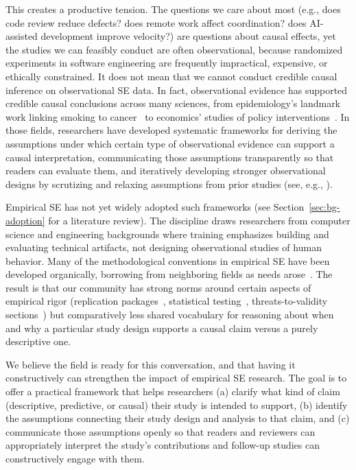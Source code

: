 This creates a productive tension. 
The questions we care about most (e.g., does code review reduce defects? does remote work affect coordination? does AI-assisted development improve velocity?) are questions about causal effects, yet the studies we can feasibly conduct are often observational, because randomized experiments in software engineering are frequently impractical, expensive, or ethically constrained. 
It does not mean that we cannot conduct credible causal inference on observational SE data.
In fact, observational evidence has supported credible causal conclusions across many sciences, from epidemiology's landmark work linking smoking to cancer~\cite{samet2016epidemiology} to economics' studies of policy interventions~\cite{abadie2018econometric}.
In those fields, researchers have developed systematic frameworks for deriving the assumptions under which certain type of observational evidence can support a causal interpretation, communicating those assumptions transparently so that readers can evaluate them, and iteratively developing stronger observational designs by scrutizing and relaxing assumptions from prior studies (see, e.g., \citet{angrist2010credibility, pearl2009causality, cunningham2021causal}).

Empirical SE has not yet widely adopted such frameworks (see Section~\ref{sec:bg-adoption} for a literature review). 
The discipline draws researchers from computer science and engineering backgrounds where training emphasizes building and evaluating technical artifacts, not designing observational studies of human behavior. 
Many of the methodological conventions in empirical SE have been developed organically, borrowing from neighboring fields as needs arose~\cite{DBLP:journals/jss/TichyLPH95, DBLP:books/sp/08/EasterbrookSSD08}.
The result is that our community has strong norms around certain aspects of empirical rigor (replication packages~\cite{DBLP:journals/corr/abs-2010-03525}, statistical testing~\cite{DBLP:books/sp/WohlinRHORW24}, threats-to-validity sections~\cite{DBLP:journals/tosem/RobillardAEGLNNSSS24}) but comparatively less shared vocabulary for reasoning about when and why a particular study design supports a causal claim versus a purely descriptive one.

We believe the field is ready for this conversation, and that having it constructively can strengthen the impact of empirical SE research. 
The goal is to offer a practical framework that helps researchers (a) clarify what kind of claim (descriptive, predictive, or causal) their study is intended to support, (b) identify the assumptions connecting their study design and analysis to that claim, and (c) communicate those assumptions openly so that readers and reviewers can appropriately interpret the study's contributions and follow-up studies can constructively engage with them.


